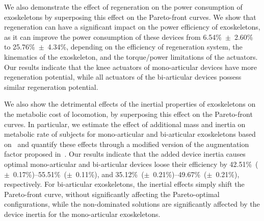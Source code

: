 \documentclass[10pt,letterpaper]{article}
\begin{document}
We also demonstrate the effect of regeneration on the power consumption of exoskeletons by superposing this effect on the Pareto-front curves. We show that regeneration can have a significant impact on the power efficiency of exoskeletons, as it can improve the power consumption of these devices from 6.54\%~$\pm$~2.60\% to 25.76\%~$\pm$~4.34\%, depending on the efficiency of regeneration system, the kinematics of the exoskeleton, and the torque/power limitations of the actuators.  Our results indicate that the knee actuators of mono-articular devices have more regeneration potential, while all actuators of the bi-articular devices possess similar regeneration potential.
%

We also show the detrimental effects of the inertial properties of exoskeletons on the metabolic cost of locomotion, by superposing this effect on the Pareto-front curves. In particular, we estimate the effect of additional mass and inertia on metabolic rate of subjects for mono-articular and bi-articular exoskeletons based on~\cite{Browning2007} and quantify these effects through a modified version of the augmentation factor proposed in~\cite{Mooney2014_a}. Our results indicate that the added device inertia causes optimal mono-articular and bi-articular devices loose their efficiency by 42.51\%~($\pm$~0.17\%)--55.51\%~($\pm$~0.11\%), and 35.12\%~($\pm$~0.21\%)--49.67\%~($\pm$~0.21\%), respectively. For bi-articular exoskeletons, the inertial effects simply shift the Pareto-front curve, without significantly affecting the Pareto-optimal configurations, while the non-dominated solutions are significantly affected by the device inertia for the mono-articular exoskeletons.
\end{document}

